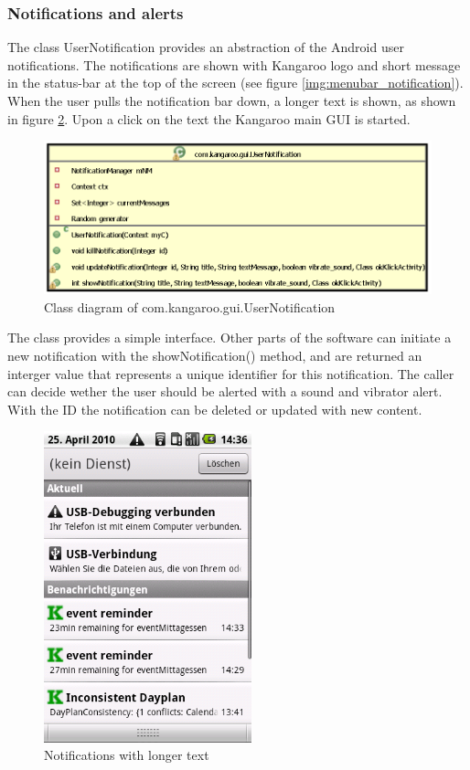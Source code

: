 \subsubsection{Notifications and alerts} %
The class UserNotification provides an abstraction of the Android user
notifications. The notifications are shown with Kangaroo logo and short message
in the status-bar at the top of the screen (see figure
\ref{img:menubar_notification}). When the user pulls the notification
bar down, a longer text is shown, as shown in figure \ref{img:notifications}.
Upon a click on the text the Kangaroo main GUI is started.
\begin{figure}[h!]
\centering
\includegraphics[width=14cm]{pics/notifications.png}
\caption{Class diagram of com.kangaroo.gui.UserNotification}
\label{android_structure}
\end{figure}
The class provides a simple interface. Other parts of the software can initiate
a new notification with the showNotification() method, and are returned an
interger value that represents a unique identifier for this notification. The
caller can decide wether the user should be alerted with a sound and vibrator
alert. With the ID the notification can be deleted or updated with new content.

\begin{figure}[h!]
    \centering
    \includegraphics[width=6cm]{pics/gui/notifications_min_late.png}
    \caption{Notifications with longer text}
    \label{img:notifications}
\end{figure}

